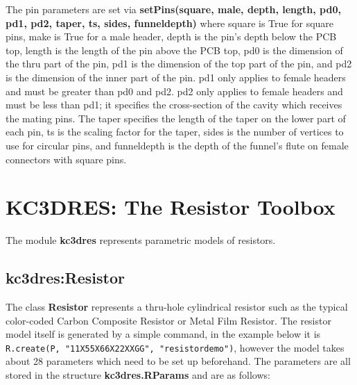 \documentclass[a4paper, dvipdfm]{article}
\begin{document}
The pin parameters are set via \textbf{setPins(square, male, depth, length, pd0, pd1, pd2, taper, ts, sides, funneldepth)}
where square is True for square pins, make is True for a male header, depth is the pin's depth below the PCB top,
length is the length of the pin above the PCB top, pd0 is the dimension of the thru part of the pin, pd1 is the
dimension of the top part of the pin, and pd2 is the dimension of the inner part of the pin. pd1 only applies to
female headers and must be greater than pd0 and pd2. pd2 only applies to female headers and must be less than pd1;
it specifies the cross-section of the cavity which receives the mating pins. The taper specifies the length of the
taper on the lower part of each pin, ts is the scaling factor for the taper, sides is the number of vertices to
use for circular pins, and funneldepth is the depth of the funnel's flute on female connectors with square pins.

\section{KC3DRES: The Resistor Toolbox}
The module \textbf{kc3dres} represents parametric models of resistors. 

\subsection{kc3dres:Resistor}
The class \textbf{Resistor} represents a thru-hole cylindrical resistor such as
the typical color-coded Carbon Composite Resistor or Metal Film Resistor. The
resistor model itself is generated by a simple command, in the example below it is
\verb#R.create(P, "11X55X66X22XXGG", "resistordemo")#, however the model takes
about 28 parameters which need to be set up beforehand.  The parameters are all
stored in the structure \textbf{kc3dres.RParams} and are as follows:
\end{document}
